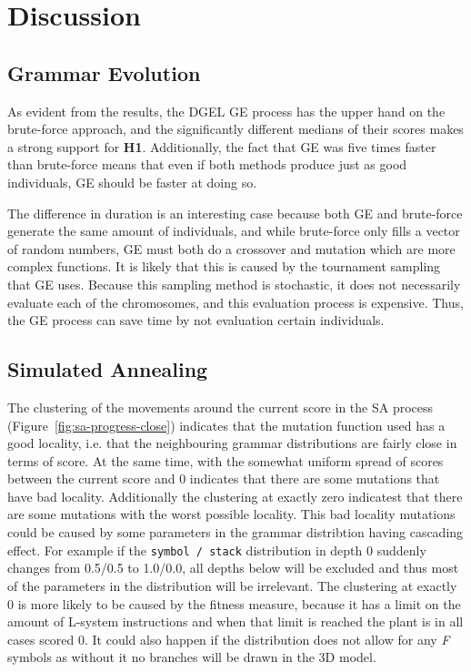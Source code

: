 \chapter{Discussion}
\section{Grammar Evolution}
As evident from the results, the DGEL GE process has the upper hand on the brute-force approach, and the significantly different medians of their scores makes a strong support for \textbf{H1}.
Additionally, the fact that GE was five times faster than brute-force means that even if both methods produce just as good individuals, GE should be faster at doing so.

The difference in duration is an interesting case because both GE and brute-force generate the same amount of individuals, and while brute-force only fills a vector of random numbers, GE must both do a crossover and mutation which are more complex functions.
It is likely that this is caused by the tournament sampling that GE uses.
Because this sampling method is stochastic, it does not necessarily evaluate each of the chromosomes, and this evaluation process is expensive.
Thus, the GE process can save time by not evaluation certain individuals.

\section{Simulated Annealing}
The clustering of the movements around the current score in the SA process (Figure~\ref{fig:sa-progress-close}) indicates that the mutation function used has a good locality, i.e. that the neighbouring grammar distributions are fairly close in terms of score.
At the same time, with the somewhat uniform spread of scores between the current score and 0 indicates that there are some mutations that have bad locality.
Additionally the clustering at exactly zero indicatest that there are some mutations with the worst possible locality.
This bad locality mutations could be caused by some parameters in the grammar distribtion having cascading effect.
For example if the \texttt{symbol / stack} distribution in depth 0 suddenly changes from 0.5/0.5 to 1.0/0.0, all depths below will be excluded and thus most of the parameters in the distribution will be irrelevant.
The clustering at exactly 0 is more likely to be caused by the fitness measure, because it has a limit on the amount of L-system instructions and when that limit is reached the plant is in all cases scored 0.
It could also happen if the distribution does not allow for any \textit{F} symbols as without it no branches will be drawn in the 3D model.

